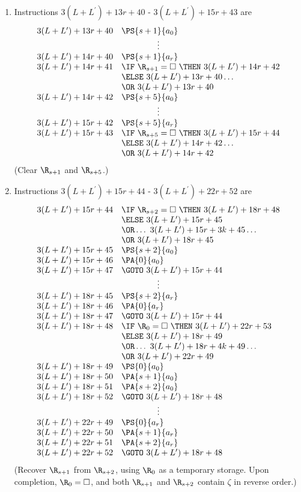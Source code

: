 \begin{enumerate}[1.]
\begin{enumerate}[(a)]
\begin{enumerate}[(1)]
\item Instructions $3(L + L^\prime) + 13r + 40$ - $3(L + L^\prime) + 15r + 43$ are
\[
\begin{array}{rl}
3(L + L^\prime) + 13r + 40 & \PS{s + 1}{a_0} \cr
\multicolumn{2}{c}{\vdots} \cr
3(L + L^\prime) + 14r + 40 & \PS{s + 1}{a_r} \cr
3(L + L^\prime) + 14r + 41 & \IF \ \R_{s + 1} = \Box \ \THEN \ 3(L + L^\prime) + 14r + 42 \cr
\ & \ELSE \ 3(L + L^\prime) + 13r + 40 \ldots \cr
\ & \OR \ 3(L + L^\prime) + 13r + 40 \cr
3(L + L^\prime) + 14r + 42 & \PS{s + 5}{a_0} \cr
\multicolumn{2}{c}{\vdots} \cr
3(L + L^\prime) + 15r + 42 & \PS{s + 5}{a_r} \cr
3(L + L^\prime) + 15r + 43 & \IF \ \R_{s + 5} = \Box \ \THEN \ 3(L + L^\prime) + 15r + 44 \cr
\ & \ELSE \ 3(L + L^\prime) + 14r + 42 \ldots \cr
\ & \OR \ 3(L + L^\prime) + 14r + 42
\end{array}
\]
(Clear $\R_{s + 1}$ and $\R_{s + 5}$.)
\item Instructions $3(L + L^\prime) + 15r + 44$ - $3(L + L^\prime) + 22r + 52$ are
\[
\begin{array}{rl}
3(L + L^\prime) + 15r + 44 & \IF \ \R_{s + 2} = \Box \ \THEN \ 3(L + L^\prime) + 18r + 48 \cr
\ & \ELSE \ 3(L + L^\prime) + 15r + 45 \cr
\ & \OR \ldots \ 3(L + L^\prime) + 15r + 3k + 45 \ldots \cr
\ & \OR \ 3(L + L^\prime) + 18r + 45 \cr
3(L + L^\prime) + 15r + 45 & \PS{s + 2}{a_0} \cr
3(L + L^\prime) + 15r + 46 & \PA{0}{a_0} \cr
3(L + L^\prime) + 15r + 47 & \GOTO \ 3(L + L^\prime) + 15r + 44 \cr
\multicolumn{2}{c}{\vdots} \cr
3(L + L^\prime) + 18r + 45 & \PS{s + 2}{a_r} \cr
3(L + L^\prime) + 18r + 46 & \PA{0}{a_r} \cr
3(L + L^\prime) + 18r + 47 & \GOTO \ 3(L + L^\prime) + 15r + 44 \cr
3(L + L^\prime) + 18r + 48 & \IF \ \R_0 = \Box \ \THEN \ 3(L + L^\prime) + 22r + 53 \cr
\ & \ELSE \ 3(L + L^\prime) + 18r + 49 \cr
\ & \OR \ldots \ 3(L + L^\prime) + 18r + 4k + 49 \ldots \cr
\ & \OR \ 3(L + L^\prime) + 22r + 49 \cr
3(L + L^\prime) + 18r + 49 & \PS{0}{a_0} \cr
3(L + L^\prime) + 18r + 50 & \PA{s + 1}{a_0} \cr
3(L + L^\prime) + 18r + 51 & \PA{s + 2}{a_0} \cr
3(L + L^\prime) + 18r + 52 & \GOTO \ 3(L + L^\prime) + 18r + 48 \cr
\multicolumn{2}{c}{\vdots} \cr
3(L + L^\prime) + 22r + 49 & \PS{0}{a_r} \cr
3(L + L^\prime) + 22r + 50 & \PA{s + 1}{a_r} \cr
3(L + L^\prime) + 22r + 51 & \PA{s + 2}{a_r} \cr
3(L + L^\prime) + 22r + 52 & \GOTO \ 3(L + L^\prime) + 18r + 48 \cr
\end{array}
\]
(Recover $\R_{s + 1}$ from $\R_{s + 2}$, using $\R_0$ as a temporary storage. Upon completion, $\R_0 = \Box$, and both $\R_{s + 1}$ and $\R_{s + 2}$ contain $\zeta$ in reverse order.)

\end{enumerate}
\end{enumerate}
\end{enumerate}
